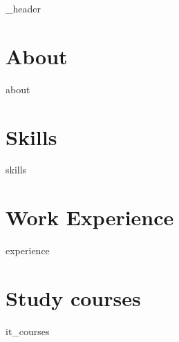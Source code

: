 \documentclass[line, letter, 14pt]{article}
\author{Ilya Kazakov}
\begin{document}
{_header}
\vspace*{1pt}

\hline
\vspace*{10pt}

\section{About}\label{sec:about}
\vspace*{3pt}
{about}
\vspace*{10pt}

\section{Skills}\label{sec:skills}
\vspace*{3pt}
{skills}
\vspace*{10pt}

\section{Work Experience}\label{sec:work-experience}
\vspace*{3pt}
{experience}
\vspace*{10pt}

\section{Study courses}\label{sec:study-courses}
\vspace*{3pt}
{it_courses}
\vspace*{10pt}
\end{document}
